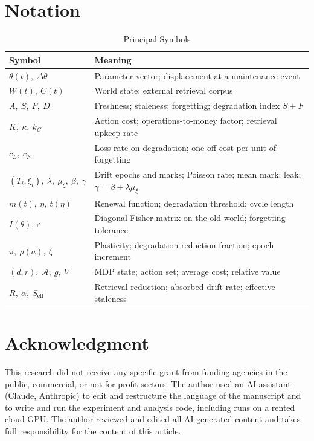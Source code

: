 \documentclass[journal]{IEEEtran}
\newcommand{\eps}{\varepsilon}
\begin{document}
\section{Notation}
\begin{table}[h]
\caption{Principal Symbols}\label{tab:notation}
\centering
\footnotesize
\begin{tabular}{p{}p{}}
\toprule
Symbol & Meaning\\
\midrule
$\theta(t),\ \Delta\theta$ & Parameter vector; displacement at a maintenance event\\
$W(t),\ C(t)$ & World state; external retrieval corpus\\
$A,\ S,\ F,\ D$ & Freshness; staleness; forgetting; degradation index $S+F$\\
$K,\ \kappa,\ k_C$ & Action cost; operations-to-money factor; retrieval upkeep rate\\
$c_L,\ c_F$ & Loss rate on degradation; one-off cost per unit of forgetting\\
$(T_i,\xi_i),\ \lambda,\ \mu_\xi,\ \beta,\ \gamma$ & Drift epochs and marks; Poisson rate; mean mark; leak; $\gamma=\beta+\lambda\mu_\xi$\\
$m(t),\ \eta,\ t(\eta)$ & Renewal function; degradation threshold; cycle length\\
$I(\theta),\ \eps$ & Diagonal Fisher matrix on the old world; forgetting tolerance\\
$\pi,\ \rho(a),\ \zeta$ & Plasticity; degradation-reduction fraction; epoch increment\\
$(d,r),\ \mathcal A,\ g,\ V$ & MDP state; action set; average cost; relative value\\
$R,\ \alpha,\ S_{\mathrm{eff}}$ & Retrieval reduction; absorbed drift rate; effective staleness\\
\bottomrule
\end{tabular}
\end{table}

\section*{Acknowledgment}
This research did not receive any specific grant from funding agencies in the public, commercial, or not-for-profit sectors. The author used an AI assistant (Claude, Anthropic) to edit and restructure the language of the manuscript and to write and run the experiment and analysis code, including runs on a rented cloud GPU. The author reviewed and edited all AI-generated content and takes full responsibility for the content of this article.
\end{document}
